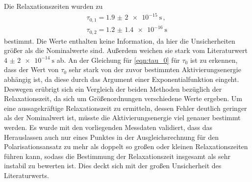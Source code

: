 Die Relaxationszeiten wurden zu
\begin{align*}
	\tau_{0,1}=\SI{1.9(20)e-15}{\second} \,, \\
	\tau_{0,2}=\SI{1.2(14)e-16}{\second} \,
\end{align*}
bestimmt. Die Werte enthalten keine Information, da hier die Unsicherheiten größer
als die Nominalwerte sind. Außerdem weichen sie stark vom Literaturwert  $\SI{4(2)e-14}{\second}$
ab. An der Gleichung für \eqref{eqn:tau_0} für $\tau_0$ ist zu erkennen, dass der Wert von $\tau_0$ sehr stark von der zuvor bestimmten Aktivierungsenergie abhängig ist, da diese durch das Argument einer Exponentialfunktion eingeht. Deswegen erübrigt sich ein Vergleich der beiden Methoden bezüglich der Relaxationszeit, da sich um Größenordnungen verschiedene Werte ergeben. Um eine aussagekräftige Relaxationszeit zu ermitteln, dessen Fehler deutlich geringer als der Nominalwert ist, müsste die Aktivierungsenergie viel genauer bestimmt werden. Es wurde mit den vorliegenden Messdaten validiert, dass das Herauslassen auch nur eines Punktes in der Ausgleichsrechnung für den Polarisationsansatz zu mehr als doppelt so großen oder kleinen Relaxationszeiten führen kann, sodass die Bestimmung der Relaxationszeit insgesamt als sehr instabil zu bewerten ist. Dies deckt sich mit der großen Unsicherheit des Literaturwerts.
